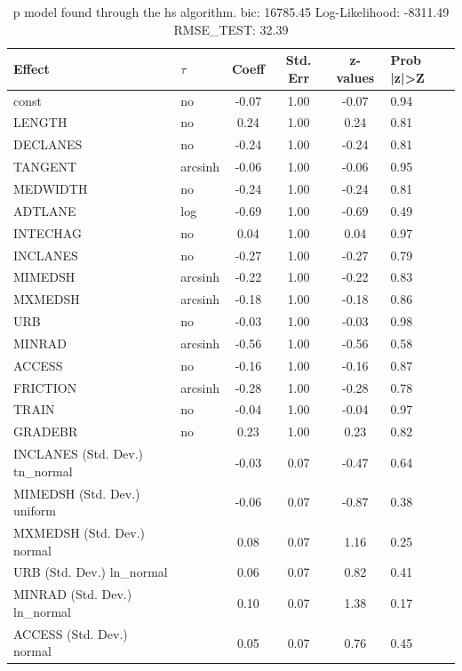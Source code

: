 \begin{table}
	\caption{p model found through the hs algorithm. bic: 16785.45 Log-Likelihood: -8311.49 RMSE_TEST: 32.39}
	\begin{center}
		\begin{tabular}{|l|l|c|c|c|l|}
			\hline
			Effect & $\tau$ & Coeff & Std. Err & z-values & Prob |z|>Z \\
			\hline
			const & no & -0.07 & 1.00 & -0.07 & 0.94 \\
			\hline
			LENGTH & no & 0.24 & 1.00 & 0.24 & 0.81 \\
			\hline
			DECLANES & no & -0.24 & 1.00 & -0.24 & 0.81 \\
			\hline
			TANGENT & arcsinh & -0.06 & 1.00 & -0.06 & 0.95 \\
			\hline
			MEDWIDTH & no & -0.24 & 1.00 & -0.24 & 0.81 \\
			\hline
			ADTLANE & log & -0.69 & 1.00 & -0.69 & 0.49 \\
			\hline
			INTECHAG & no & 0.04 & 1.00 & 0.04 & 0.97 \\
			\hline
			INCLANES & no & -0.27 & 1.00 & -0.27 & 0.79 \\
			\hline
			MIMEDSH & arcsinh & -0.22 & 1.00 & -0.22 & 0.83 \\
			\hline
			MXMEDSH & arcsinh & -0.18 & 1.00 & -0.18 & 0.86 \\
			\hline
			URB & no & -0.03 & 1.00 & -0.03 & 0.98 \\
			\hline
			MINRAD & arcsinh & -0.56 & 1.00 & -0.56 & 0.58 \\
			\hline
			ACCESS & no & -0.16 & 1.00 & -0.16 & 0.87 \\
			\hline
			FRICTION & arcsinh & -0.28 & 1.00 & -0.28 & 0.78 \\
			\hline
			TRAIN & no & -0.04 & 1.00 & -0.04 & 0.97 \\
			\hline
			GRADEBR & no & 0.23 & 1.00 & 0.23 & 0.82 \\
			\hline
			INCLANES (Std. Dev.) tn_normal &  & -0.03 & 0.07 & -0.47 & 0.64 \\
			\hline
			MIMEDSH (Std. Dev.) uniform &  & -0.06 & 0.07 & -0.87 & 0.38 \\
			\hline
			MXMEDSH (Std. Dev.) normal &  & 0.08 & 0.07 & 1.16 & 0.25 \\
			\hline
			URB (Std. Dev.) ln_normal &  & 0.06 & 0.07 & 0.82 & 0.41 \\
			\hline
			MINRAD (Std. Dev.) ln_normal &  & 0.10 & 0.07 & 1.38 & 0.17 \\
			\hline
			ACCESS (Std. Dev.) normal &  & 0.05 & 0.07 & 0.76 & 0.45 \\

\end{tabular}
\end{center}
\end{table}
